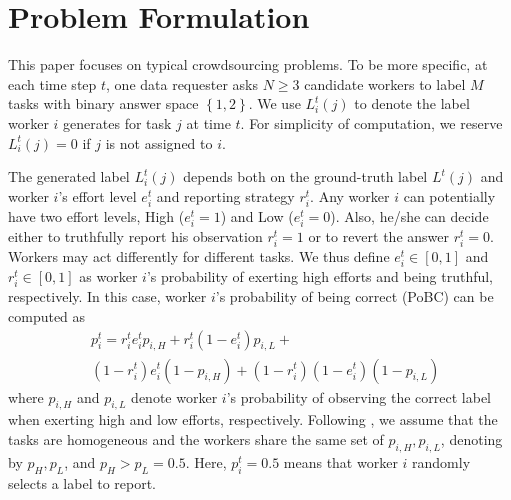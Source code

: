 \section{Problem Formulation}
\label{PF}
This paper focuses on typical crowdsourcing problems. To be more specific, at each time step $t$, one data requester asks $N \geq 3$ candidate workers to label $M$ tasks with binary answer space $\left\{1,2\right\}$. We use $L^t_i(j)$ to denote the label worker $i$ generates for task $j$ at time $t$. For simplicity of computation, we reserve $L^t_i(j) = 0$ if  $j$ is not assigned to $i$.


The generated label $L^{t}_{i}(j)$ depends both on the ground-truth label $L^{t}(j)$ and worker $i$'s effort level $e^{t}_i$ and reporting strategy $r^{t}_i$.
Any worker $i$ can potentially have two effort levels, High ($e^{t}_i=1$) and Low ($e^{t}_i=0$).
Also, he/she can decide either to truthfully report his observation $r^{t}_i = 1$ or to revert the answer $r^{t}_i = 0$.
Workers may act differently for different tasks. 
We thus define $e^{t}_i\in[0,1]$ and $r^{t}_i\in[0,1]$ as worker $i$'s probability of exerting high efforts and being truthful, respectively.
In this case, worker $i$'s probability of being correct (PoBC) can be computed as
\begin{equation}
\begin{split}
&p^{t}_i=r^{t}_i e^{t}_i p_{i, H}+r^{t}_i (1-e^{t}_i) p_{i, L}+\\
&(1-r^{t}_i) e^{t}_i (1-p_{i, H})+(1-r^{t}_i) (1-e^{t}_i) (1-p_{i, L})
\end{split}
\end{equation}
where $p_{i, H}$ and $p_{i, L}$ denote worker $i$'s probability of observing the correct label when exerting high and low efforts, respectively.
Following \cite{dasgupta2013crowdsourced,liu2017sequential}, we assume that the tasks are homogeneous and the workers share the same set of $p_{i, H}, p_{i, L}$, denoting by $p_H, p_L$, and $p_{H}>p_{L}= 0.5$.
Here, $p^t_i=0.5$ means that worker $i$ randomly selects a label to report.

